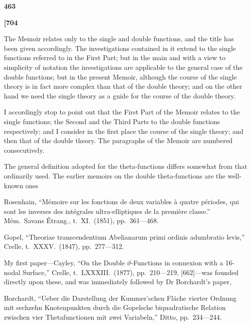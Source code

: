 \documentclass[12pt,a4paper]{article}
\theoremstyle{definition}
\begin{document}
\begin{center}
\textbf{463}
\end{center}

\vspace{0.5em}

\noindent\textbf{[704}

\vspace{0.5em}

The Memoir relates only to the single and double functions, and the title has been given accordingly. The investigations contained in it extend to the single functions referred to in the First Part; but in the main and with a view to simplicity of notation the investigations are applicable to the general case of the double functions; but in the present Memoir, although the course of the single theory is in fact more complex than that of the double theory; and on the other hand we need the single theory as a guide for the course of the double theory.

I accordingly stop to point out that the First Part of the Memoir relates to the single functions; the Second and the Third Parts to the double functions respectively; and I consider in the first place the course of the single theory; and then that of the double theory. The paragraphs of the Memoir are numbered consecutively.

The general definition adopted for the theta-functions differs somewhat from that ordinarily used. The earlier memoirs on the double theta-functions are the well-known ones

\noindent Rosenhain, ``M\'{e}moire sur les fonctions de deux variables \`{a} quatre p\'{e}riodes, qui sont les inverses des int\'{e}grales ultra-elliptiques de la premi\`{e}re classe.'' M\'{e}m.\ Savans \'{E}trang., t.~XI.\ (1851), pp.~361---468.

\noindent Gopel, ``Theoriae transcendentium Abelianarum primi ordinis adumbratio levis,'' Crelle, t.~XXXV.\ (1847), pp.~277---312.

\noindent My first paper---Cayley, ``On the Double $\vartheta$-Functions in connexion with a 16-nodal Surface,'' Crelle, t.~LXXXIII.\ (1877), pp.~210---219, [662]---was founded directly upon these, and was immediately followed by Dr Borchardt's paper,

\noindent Borchardt, ``Ueber die Darstellung der Kummer'schen Fl\"{a}che vierter Ordnung mit sechzehn Knotenpunkten durch die Gopelsche biquadratische Relation zwischen vier Thetafunctionen mit zwei Variabeln,'' Ditto, pp.~234---244.
\end{document}
